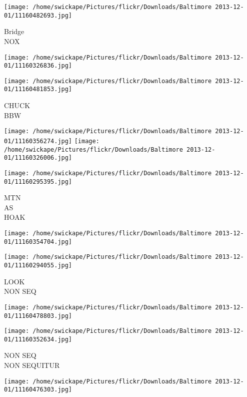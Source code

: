\documentclass[10pt,letterpaper]{article}
\begin{document}
\vspace{0.25in}
\texttt{[image: /home/swickape/Pictures/flickr/Downloads/Baltimore 2013-12-01/11160482693.jpg]}

Bridge\\
NOX\\
\pagebreak

\texttt{[image: /home/swickape/Pictures/flickr/Downloads/Baltimore 2013-12-01/11160326836.jpg]}

\vspace{0.25in}
\texttt{[image: /home/swickape/Pictures/flickr/Downloads/Baltimore 2013-12-01/11160481853.jpg]}

CHUCK\\
BBW\\
\pagebreak

\texttt{[image: /home/swickape/Pictures/flickr/Downloads/Baltimore 2013-12-01/11160356274.jpg]}
\texttt{[image: /home/swickape/Pictures/flickr/Downloads/Baltimore 2013-12-01/11160326006.jpg]}

\texttt{[image: /home/swickape/Pictures/flickr/Downloads/Baltimore 2013-12-01/11160295395.jpg]}

MTN\\
AS\\
HOAK\\
\pagebreak

\texttt{[image: /home/swickape/Pictures/flickr/Downloads/Baltimore 2013-12-01/11160354704.jpg]}

\vspace{0.25in}
\texttt{[image: /home/swickape/Pictures/flickr/Downloads/Baltimore 2013-12-01/11160294055.jpg]}

LOOK\\
NON SEQ\\
\pagebreak

\texttt{[image: /home/swickape/Pictures/flickr/Downloads/Baltimore 2013-12-01/11160478803.jpg]}

\vspace{0.25in}
\texttt{[image: /home/swickape/Pictures/flickr/Downloads/Baltimore 2013-12-01/11160352634.jpg]}

NON SEQ\\
NON SEQUITUR\\
\pagebreak

\texttt{[image: /home/swickape/Pictures/flickr/Downloads/Baltimore 2013-12-01/11160476303.jpg]}
\end{document}
